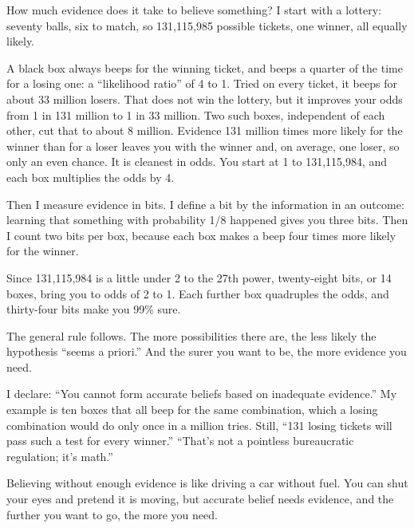 
How much evidence does it take to believe something? I start with a lottery: seventy balls, six to match, so 131,115,985 possible tickets, one winner, all equally likely.

A black box always beeps for the winning ticket, and beeps a quarter of the time for a losing one: a ``likelihood ratio'' of 4 to 1. Tried on every ticket, it beeps for about 33 million losers. That does not win the lottery, but it improves your odds from 1 in 131 million to 1 in 33 million. Two such boxes, independent of each other, cut that to about 8 million. Evidence 131 million times more likely for the winner than for a loser leaves you with the winner and, on average, one loser, so only an even chance. It is cleanest in odds. You start at 1 to 131,115,984, and each box multiplies the odds by 4.

Then I measure evidence in bits. I define a bit by the information in an outcome: learning that something with probability 1/8 happened gives you three bits. Then I count two bits per box, because each box makes a beep four times more likely for the winner. 

Since 131,115,984 is a little under 2 to the 27th power, twenty-eight bits, or 14 boxes, bring you to odds of 2 to 1. Each further box quadruples the odds, and thirty-four bits make you 99\% sure.

The general rule follows. The more possibilities there are, the less likely the hypothesis ``seems a priori.'' And the surer you want to be, the more evidence you need. 

I declare: ``You cannot form accurate beliefs based on inadequate evidence.''  My example is ten boxes that all beep for the same combination, which a losing combination would do only once in a million tries. Still, ``131 losing tickets will pass such a test for every winner.'' ``That's not a pointless bureaucratic regulation; it's math.''

Believing without enough evidence is like driving a car without fuel. You can shut your eyes and pretend it is moving, but accurate belief needs evidence, and the further you want to go, the more you need.
